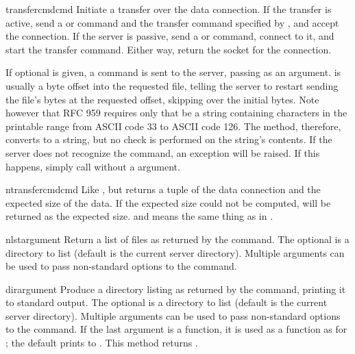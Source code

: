 \begin{methoddesc}{transfercmd}{cmd}
Initiate a transfer over the data connection.  If the transfer is
active, send a  or   command and the transfer command specified
by , and accept the connection.  If the server is passive,
send a  or  command, connect to it, and start the transfer
command.  Either way, return the socket for the connection.

If optional  is given, a  command is
sent to the server, passing  as an argument.   is
usually a byte offset into the requested file, telling the server to
restart sending the file's bytes at the requested offset, skipping
over the initial bytes.  Note however that RFC
959 requires only that  be a string containing characters
in the printable range from ASCII code 33 to ASCII code 126.  The
 method, therefore, converts
 to a string, but no check is
performed on the string's contents.  If the server does
not recognize the  command, an
 exception will be raised.  If this happens,
simply call  without a  argument.
\end{methoddesc}

\begin{methoddesc}{ntransfercmd}{cmd}
Like , but returns a tuple of the data
connection and the expected size of the data.  If the expected size
could not be computed,  will be returned as the expected
size.   and  means the same thing as in
.
\end{methoddesc}

\begin{methoddesc}{nlst}{argument\optional{, \ldots}}
Return a list of files as returned by the  command.  The
optional  is a directory to list (default is the current
server directory).  Multiple arguments can be used to pass
non-standard options to the  command.
\end{methoddesc}

\begin{methoddesc}{dir}{argument\optional{, \ldots}}
Produce a directory listing as returned by the  command,
printing it to standard output.  The optional  is a
directory to list (default is the current server directory).  Multiple
arguments can be used to pass non-standard options to the 
command.  If the last argument is a function, it is used as a
 function as for ; the default
prints to .  This method returns .
\end{methoddesc}

